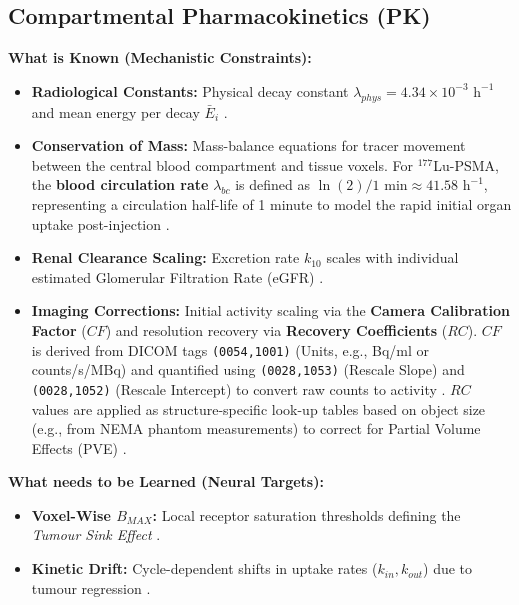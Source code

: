 \documentclass[11pt,a4paper]{article}
\begin{document}
\subsection{Compartmental Pharmacokinetics (PK)}
\textbf{What is Known (Mechanistic Constraints):}
\begin{itemize}
    \item \textbf{Radiological Constants:} Physical decay constant $\lambda_{phys} = 4.34 \times 10^{-3} \text{ h}^{-1}$ and mean energy per decay $\bar{E}_i$ \cite{ReschFouladgar2023, StabinMadsen2019}.
    \item \textbf{Conservation of Mass:} Mass-balance equations for tracer movement between the central blood compartment and tissue voxels. For $^{177}$Lu-PSMA, the \textbf{blood circulation rate} $\lambda_{bc}$ is defined as $\ln(2)/1 \text{ min} \approx 41.58 \text{ h}^{-1}$, representing a circulation half-life of 1 minute to model the rapid initial organ uptake post-injection \cite{HardiansyahYousefzadehNowshahr2024}.
    \item \textbf{Renal Clearance Scaling:} Excretion rate $k_{10}$ scales with individual estimated Glomerular Filtration Rate (eGFR) \cite{HardiansyahYousefzadehNowshahr2024}.
    \item \textbf{Imaging Corrections:} Initial activity scaling via the \textbf{Camera Calibration Factor} ($CF$) and resolution recovery via \textbf{Recovery Coefficients} ($RC$). $CF$ is derived from DICOM tags \texttt{(0054,1001)} (Units, e.g., Bq/ml or counts/s/MBq) and quantified using \texttt{(0028,1053)} (Rescale Slope) and \texttt{(0028,1052)} (Rescale Intercept) to convert raw counts to activity \cite{GleisnerChouin2022}. $RC$ values are applied as structure-specific look-up tables based on object size (e.g., from NEMA phantom measurements) to correct for Partial Volume Effects (PVE) \cite{KlettingSchimmel2015}.
\end{itemize}

\textbf{What needs to be Learned (Neural Targets):}
\begin{itemize}
    \item \textbf{Voxel-Wise $B_{MAX}$:} Local receptor saturation thresholds defining the \textit{Tumour Sink Effect} \cite{BegumThieme2018}.
    \item \textbf{Kinetic Drift:} Cycle-dependent shifts in uptake rates ($k_{in}, k_{out}$) due to tumour regression \cite{OkamotoThieme2016, SiebingaVeen2024}.
\end{itemize}
\end{document}
